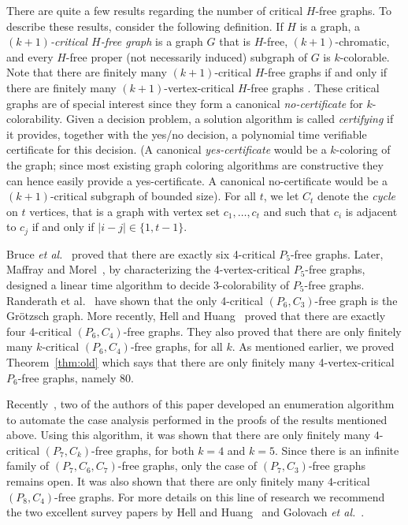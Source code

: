 \documentclass[11pt]{article}
\newcommand{\jg}[1] {
	{\color{blue}{{\tt [JG: }{#1}\tt]}}
}
\begin{document}
There are quite a few results regarding the number of critical $H$-free graphs.
To describe these results, consider the following definition.
If $H$ is a graph, a \emph{$(k+1)$-critical $H$-free graph} is a graph $G$  that is $H$-free, $(k+1)$-chromatic, and every $H$-free proper (not necessarily induced) subgraph of $G$ is $k$-colorable.
Note that there are finitely many $(k+1)$-critical $H$-free graphs if and only if there are finitely many $(k+1)$-vertex-critical $H$-free 
graphs \cite{Hoang2}. 
These critical graphs are of special interest since they form a canonical \textit{no-certificate} for $k$-colorability. Given a decision problem, a solution algorithm is called \emph{certifying} if it provides, together with the yes/no decision, a polynomial time verifiable certificate for this decision. (A canonical \textit{yes-certificate} would be a $k$-coloring of the graph; since most existing graph coloring algorithms are constructive they can hence easily provide a yes-certificate. A canonical no-certificate would be a $(k+1)$-critical subgraph of bounded size).
For all $t$, we let $C_t$ denote the  {\em cycle} on $t$ vertices,
that is a graph with vertex set $c_1, \ldots, c_t$ and such that 
$c_i$ is adjacent to $c_j$ if and only if $|i-j| \in \{1,t-1\}$.

Bruce \emph{et al.}~\cite{BHS09} proved that there are exactly six 4-critical $P_5$-free graphs.
Later, Maffray and Morel~\cite{MM12}, by characterizing the 4-vertex-critical $P_5$-free graphs, designed a linear time algorithm to decide 3-colorability of $P_5$-free graphs.
Randerath et al.~\cite{randerath_04} have shown that the only 4-critical $(P_6,C_3)$-free graph is the Gr\"otzsch graph.
More recently, Hell and Huang~\cite{hell_14,Hell-survey-coloring} proved that there are exactly four 4-critical $(P_6,C_4)$-free graphs.
They also proved that there are only finitely many $k$-critical $(P_6,C_4)$-free graphs, for all $k$.
As mentioned earlier, we proved Theorem~\ref{thm:old} which says that there are only finitely many 4-vertex-critical $P_6$-free graphs, namely 80.

Recently~\cite{GS15}, two of the authors of this paper developed an enumeration algorithm to automate the case analysis performed in the proofs of the results mentioned above.
Using this algorithm, it was shown that there are only finitely many $4$-critical $(P_7,C_k)$-free graphs, for both $k=4$ and $k=5$.
Since there is an infinite family of $(P_7,C_6,C_7)$-free graphs, only the case of $(P_7,C_3)$-free graphs remains open. 
It was also shown that there are only finitely many $4$-critical $(P_8,C_4)$-free graphs. 
For more details on this line of research we recommend the two excellent survey papers by Hell and Huang~\cite{Hell-survey-coloring} and Golovach \emph{et al.}~\cite{GJPS15}.
\end{document}
